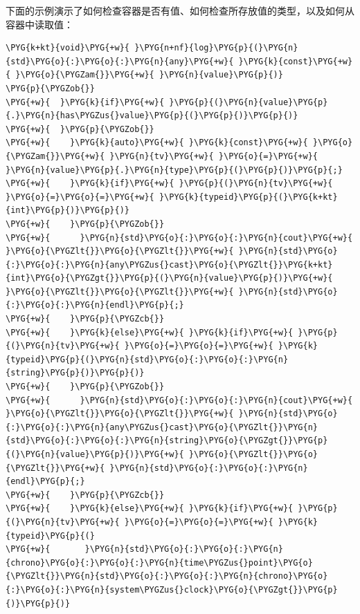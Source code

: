 
下面的示例演示了如何检查容器是否有值、如何检查所存放值的类型，以及如何从容器中读取值：



\begin{codeblockbg}
\begin{Verbatim}[commandchars=\\\{\},breaklines=true,breakanywhere=true,fontsize=\codefont,xleftmargin=17bp]
\PYG{k+kt}{void}\PYG{+w}{ }\PYG{n+nf}{log}\PYG{p}{(}\PYG{n}{std}\PYG{o}{:}\PYG{o}{:}\PYG{n}{any}\PYG{+w}{ }\PYG{k}{const}\PYG{+w}{ }\PYG{o}{\PYGZam{}}\PYG{+w}{ }\PYG{n}{value}\PYG{p}{)}
\PYG{p}{\PYGZob{}}
\PYG{+w}{  }\PYG{k}{if}\PYG{+w}{ }\PYG{p}{(}\PYG{n}{value}\PYG{p}{.}\PYG{n}{has\PYGZus{}value}\PYG{p}{(}\PYG{p}{)}\PYG{p}{)}
\PYG{+w}{  }\PYG{p}{\PYGZob{}}
\PYG{+w}{    }\PYG{k}{auto}\PYG{+w}{ }\PYG{k}{const}\PYG{+w}{ }\PYG{o}{\PYGZam{}}\PYG{+w}{ }\PYG{n}{tv}\PYG{+w}{ }\PYG{o}{=}\PYG{+w}{ }\PYG{n}{value}\PYG{p}{.}\PYG{n}{type}\PYG{p}{(}\PYG{p}{)}\PYG{p}{;}
\PYG{+w}{    }\PYG{k}{if}\PYG{+w}{ }\PYG{p}{(}\PYG{n}{tv}\PYG{+w}{ }\PYG{o}{=}\PYG{o}{=}\PYG{+w}{ }\PYG{k}{typeid}\PYG{p}{(}\PYG{k+kt}{int}\PYG{p}{)}\PYG{p}{)}
\PYG{+w}{    }\PYG{p}{\PYGZob{}}
\PYG{+w}{      }\PYG{n}{std}\PYG{o}{:}\PYG{o}{:}\PYG{n}{cout}\PYG{+w}{ }\PYG{o}{\PYGZlt{}}\PYG{o}{\PYGZlt{}}\PYG{+w}{ }\PYG{n}{std}\PYG{o}{:}\PYG{o}{:}\PYG{n}{any\PYGZus{}cast}\PYG{o}{\PYGZlt{}}\PYG{k+kt}{int}\PYG{o}{\PYGZgt{}}\PYG{p}{(}\PYG{n}{value}\PYG{p}{)}\PYG{+w}{ }\PYG{o}{\PYGZlt{}}\PYG{o}{\PYGZlt{}}\PYG{+w}{ }\PYG{n}{std}\PYG{o}{:}\PYG{o}{:}\PYG{n}{endl}\PYG{p}{;}
\PYG{+w}{    }\PYG{p}{\PYGZcb{}}
\PYG{+w}{    }\PYG{k}{else}\PYG{+w}{ }\PYG{k}{if}\PYG{+w}{ }\PYG{p}{(}\PYG{n}{tv}\PYG{+w}{ }\PYG{o}{=}\PYG{o}{=}\PYG{+w}{ }\PYG{k}{typeid}\PYG{p}{(}\PYG{n}{std}\PYG{o}{:}\PYG{o}{:}\PYG{n}{string}\PYG{p}{)}\PYG{p}{)}
\PYG{+w}{    }\PYG{p}{\PYGZob{}}
\PYG{+w}{      }\PYG{n}{std}\PYG{o}{:}\PYG{o}{:}\PYG{n}{cout}\PYG{+w}{ }\PYG{o}{\PYGZlt{}}\PYG{o}{\PYGZlt{}}\PYG{+w}{ }\PYG{n}{std}\PYG{o}{:}\PYG{o}{:}\PYG{n}{any\PYGZus{}cast}\PYG{o}{\PYGZlt{}}\PYG{n}{std}\PYG{o}{:}\PYG{o}{:}\PYG{n}{string}\PYG{o}{\PYGZgt{}}\PYG{p}{(}\PYG{n}{value}\PYG{p}{)}\PYG{+w}{ }\PYG{o}{\PYGZlt{}}\PYG{o}{\PYGZlt{}}\PYG{+w}{ }\PYG{n}{std}\PYG{o}{:}\PYG{o}{:}\PYG{n}{endl}\PYG{p}{;}
\PYG{+w}{    }\PYG{p}{\PYGZcb{}}
\PYG{+w}{    }\PYG{k}{else}\PYG{+w}{ }\PYG{k}{if}\PYG{+w}{ }\PYG{p}{(}\PYG{n}{tv}\PYG{+w}{ }\PYG{o}{=}\PYG{o}{=}\PYG{+w}{ }\PYG{k}{typeid}\PYG{p}{(}
\PYG{+w}{       }\PYG{n}{std}\PYG{o}{:}\PYG{o}{:}\PYG{n}{chrono}\PYG{o}{:}\PYG{o}{:}\PYG{n}{time\PYGZus{}point}\PYG{o}{\PYGZlt{}}\PYG{n}{std}\PYG{o}{:}\PYG{o}{:}\PYG{n}{chrono}\PYG{o}{:}\PYG{o}{:}\PYG{n}{system\PYGZus{}clock}\PYG{o}{\PYGZgt{}}\PYG{p}{)}\PYG{p}{)}

\end{Verbatim}
\end{codeblockbg}
